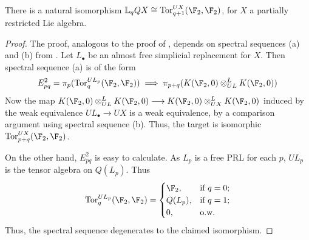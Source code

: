 \documentclass[10pt]{article}
\newcommand{\derived}{\mathbb{L}}
\begin{document}
\begin{PRlieKoszulComplexCalculationOriginalWithSSeq}
\begin{prop}
There is a natural isomorphism $\derived_q QX\cong \Tor^{UX}_{q+1}(\F_2,\F_2)$, for $X$ a partially restricted Lie algebra.
\end{prop}
\begin{proof}
The proof, analogous to the proof of \cite[3.5]{PriddySimplicialLie.pdf}, depends on spectral sequences (a) and (b) from \cite[II.6.6]{QuillenHomAlg.pdf}. Let $L_\bullet$ be an almost free simplicial replacement for $X$. Then spectral sequence (a) is of the form
\[E^2_{pq}=\pi_p(\Tor^{UL_p}_q(\F_2,\F_2))\implies \pi_{p+q}(K(\F_2,0)\otimes_{UL}^{L}K(\F_2,0))\]
Now the map $K(\F_2,0)\otimes_{UL}^{L}K(\F_2,0) \to K(\F_2,0)\otimes_{UX}^{L}K(\F_2,0)$ induced by the weak equivalence $UL_\bullet\to UX$ is a weak equivalence, by a comparison argument using spectral sequence (b). Thus, the target is isomorphic $\Tor^{UX}_{p+q}(\F_2,\F_2)$.

On the other hand, $E^2_{pq}$ is easy to calculate. As $L_p$ is a free PRL for each $p$, $UL_p$ is the tensor algebra on $Q(L_p)$. Thus
\[\Tor^{UL_p}_q(\F_2,\F_2)=\begin{cases}
\F_2,&\textup{if }q=0;\\
Q(L_p),&\textup{if }q=1;\\
0,&\textup{o.w. }
\end{cases}
\]
Thus, the spectral sequence degenerates to the claimed isomorphism.
\end{proof}


\end{PRlieKoszulComplexCalculationOriginalWithSSeq}
\end{document}
